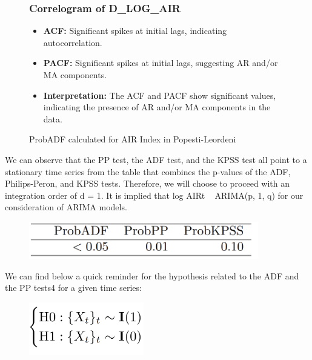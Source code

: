 \documentclass{article} %
\begin{document}
\begin{figure}[H]
\begin{minipage}{0.5\linewidth}
        \subsubsection*{Correlogram of D\_LOG\_AIR}
        \begin{itemize}
            \item \textbf{ACF:} Significant spikes at initial lags, indicating autocorrelation.
            \item \textbf{PACF:} Significant spikes at initial lags, suggesting AR and/or MA components.
            \item \textbf{Interpretation:} The ACF and PACF show significant values, indicating the presence of AR and/or MA components in the data.
        \end{itemize}
    \end{minipage}
    \caption{ProbADF calculated for AIR Index in Popesti-Leordeni}
\end{figure}

We can observe that the PP test, the ADF test, and the KPSS test all point to a stationary time series from the table that combines the p-values of the ADF, Philips-Peron, and KPSS tests. Therefore, we will choose to proceed with an integration order of d = 1. It is implied that {log AIR}t ~ ARIMA(p, 1, q) for our consideration of ARIMA models.

\begin{figure}[H]
    \centering
    \includegraphics[width=10cm]{images/image15.png}
\end{figure}

We can find below a quick reminder for the hypothesis related to the ADF and the PP tests4 for a given time series: 

\begin{figure}[H]
    \centering
    \includegraphics[width=5cm]{images/image24.png}
\end{figure}
\end{document}

